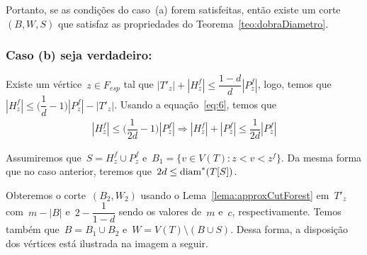 		Portanto, se as condições do caso~(a) forem satisfeitas, então 
		existe um corte~$(B,W,S)$ que satisfaz as propriedades do
		Teorema~\ref{teo:dobraDiametro}.

	\bigskip
	\bigskip
	\newpage
	
	\subsubsection*{Caso (b) seja verdadeiro:}

	Existe um vértice~$z\in F_{esp}$ 
	tal que ${|T'_{z}|+|H_z^f|\le
	\dfrac{1-d}{d}|P_z^f|}$, logo, temos
	que~${|H^f_z|\le \Big(\dfrac{1}{d}-1\Big)|P^f_z|-|T'_z|}$.
	Usando a equação~\ref{eq:6}, temos 
	que
	\begin{align}
		|H^f_z|\le\Big(\dfrac{1}{2d}-1\Big)|P^f_z|
		\Rightarrow
		|H^f_z|+|P^f_z|\le\dfrac{1}{2d}|P^f_z| \nonumber
	\end{align}


	Assumiremos que~${S = H^f_z \cup P^f_z}$ 
	e~${B_1 = \{v\in V(T): z<v<z^f\}}$. 
	Da mesma forma que no caso anterior, teremos 
	que~${2d\le \mathrm{diam}^*(T[S])}$.

	Obteremos o corte~$(B_2,W_2)$ usando o 
	Lema~\ref{lema:approxCutForest} em~$T'_z$ 
	com~${m-|B|}$ e~${2-\dfrac{1}{1-d}}$ sendo os valores
	de~$m$ e~$c$, respectivamente. 
	Temos também que~${B = B_1 \cup B_2}$ 
	e~${W = V(T)\setminus (B\cup S)}$.
	Dessa forma, a disposição dos 
	vértices está ilustrada na imagem a seguir.

